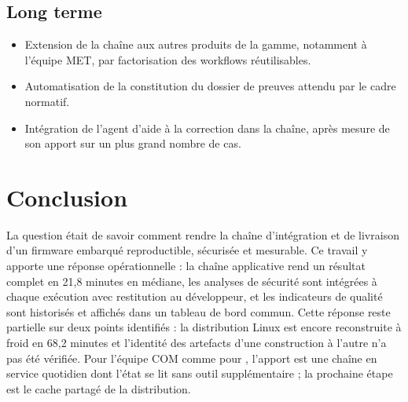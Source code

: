 \subsection{Long terme}
\begin{itemize}[nosep]
  \item Extension de la chaîne aux autres produits de la gamme, notamment à
        l'équipe MET, par factorisation des workflows réutilisables.
  \item Automatisation de la constitution du dossier de preuves attendu par le
        cadre normatif.
  \item Intégration de l'agent d'aide à la correction dans la chaîne, après
        mesure de son apport sur un plus grand nombre de cas.
\end{itemize}

\section{Conclusion}
\label{sec:concl-conclusion}

La question était de savoir comment rendre la chaîne d'intégration et de
livraison d'un firmware embarqué reproductible, sécurisée et mesurable. Ce
travail y apporte une réponse opérationnelle : la chaîne applicative rend un
résultat complet en 21,8 minutes en médiane, les analyses de sécurité sont
intégrées à chaque exécution avec restitution au développeur, et les
indicateurs de qualité sont historisés et affichés dans un tableau de bord
commun. Cette réponse reste partielle sur deux points identifiés : la
distribution Linux est encore reconstruite à froid en 68,2 minutes et
l'identité des artefacts d'une construction à l'autre n'a pas été vérifiée.
Pour l'équipe COM comme pour \Entreprise, l'apport est une chaîne en service
quotidien dont l'état se lit sans outil supplémentaire ; la prochaine étape est
le cache partagé de la distribution.

